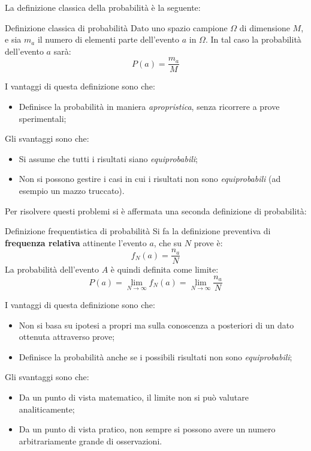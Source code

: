 \documentclass[a4paper,11pt]{article}
\begin{document}
La definizione classica della probabilità è la seguente:
\begin{definition}{Definizione classica di probabilità}
	Dato uno spazio campione $\Omega$ di dimensione $M$, e sia $m_a$ il numero di elementi parte dell'evento $a$ in $\Omega$. In tal caso la probabilità dell'evento $a$ sarà:
	$$
		P(a) = \frac{m_a}{M}
	$$
\end{definition}

I vantaggi di questa definizione sono che:
\begin{itemize}
	\item Definisce la probabilità in maniera \textit{apropristica}, senza ricorrere a prove sperimentali;
\end{itemize}
Gli svantaggi sono che:
\begin{itemize}
	\item Si assume che tutti i risultati siano \textit{equiprobabili};
	\item Non si possono gestire i casi in cui i risultati non sono \textit{equiprobabili} (ad esempio un mazzo truccato).
\end{itemize}

Per risolvere questi problemi si è affermata una seconda definizione di probabilità:
\begin{definition}{Definizione frequentistica di probabilità}
	Si fa la definizione preventiva di \textbf{frequenza relativa} attinente l'evento $a$, che su $N$ prove è:
	$$
		f_N(a) = \frac{n_a}{N}
	$$
	\tcblower
	La probabilità dell'evento $A$ è quindi definita come limite:
	$$
	P(a) = \lim_{N \rightarrow \infty} f_N(a) = \lim_{N \rightarrow \infty} \frac{n_a}{N} 
	$$
\end{definition}

\newpage

I vantaggi di questa definizione sono che:
\begin{itemize}
	\item Non si basa su ipotesi a propri ma sulla conoscenza a posteriori di un dato ottenuta attraverso prove;
	\item Definisce la probabilità anche se i possibili risultati non sono \textit{equiprobabili}; 
\end{itemize}
Gli svantaggi sono che:
\begin{itemize}
	\item Da un punto di vista matematico, il limite non si può valutare analiticamente;
	\item Da un punto di vista pratico, non sempre si possono avere un numero arbitrariamente grande di osservazioni. 
\end{itemize}
\end{document}
